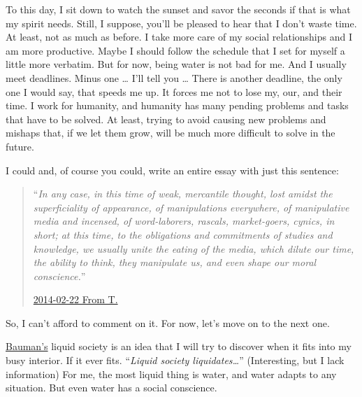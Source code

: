 \documentclass[]{book}
\begin{document}
To this day, I sit down to watch the sunset and savor the seconds if that is what my spirit needs. Still, I suppose, you'll be pleased to hear that I don't waste time. At least, not as much as before. I take more care of my social relationships and I am more productive. Maybe I should follow the schedule that I set for myself a little more verbatim. But for now, being water is not bad for me. And I usually meet deadlines. Minus one \ldots{} I'll tell you \ldots{} There is another deadline, the only one I would say, that speeds me up. It forces me not to lose my, our, and their time. I work for humanity, and humanity has many pending problems and tasks that have to be solved. At least, trying to avoid causing new problems and mishaps that, if we let them grow, will be much more difficult to solve in the future.

I could and, of course you could, write an entire essay with just this sentence:

\begin{quote}
``\emph{In any case, in this time of weak, mercantile thought, lost amidst the superficiality of appearance, of manipulations everywhere, of manipulative media and incensed, of word-laborers, rascals, market-goers, cynics, in short; at this time, to the obligations and commitments of studies and knowledge, we usually unite the eating of the media, which dilute our time, the ability to think, they manipulate us, and even shape our moral conscience.}''

\protect\hyperlink{fromT20140222}{2014-02-22 From T.}
\end{quote}

So, I can't afford to comment on it. For now, let's move on to the next one.

\href{https://en.wikipedia.org/wiki/Zygmunt_Bauman}{Bauman's} liquid society \citep{bauman2013liquid} is an idea that I will try to discover when it fits into my busy interior. If it ever fits. ``\emph{Liquid society liquidates\ldots{}}'' (Interesting, but I lack information) For me, the most liquid thing is water, and water adapts to any situation. But even water has a social conscience.
\end{document}
